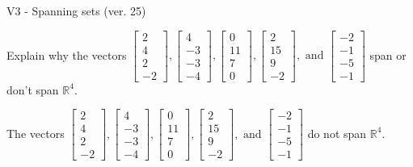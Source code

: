 \begin{exercise}
  \begin{exerciseTitle}V3 - Spanning sets (ver. 25)\end{exerciseTitle}
  \begin{exerciseStatement}
    Explain why the vectors \(\left[\begin{array}{r}
2 \\
4 \\
2 \\
-2
\end{array}\right] , \left[\begin{array}{r}
4 \\
-3 \\
-3 \\
-4
\end{array}\right] , \left[\begin{array}{r}
0 \\
11 \\
7 \\
0
\end{array}\right] , \left[\begin{array}{r}
2 \\
15 \\
9 \\
-2
\end{array}\right] , \text{ and } \left[\begin{array}{r}
-2 \\
-1 \\
-5 \\
-1
\end{array}\right]\) span or don't span \(\mathbb{R}^4\). 
	


  \end{exerciseStatement}
  \begin{exerciseAnswer}
   The vectors \(\left[\begin{array}{r}
2 \\
4 \\
2 \\
-2
\end{array}\right] , \left[\begin{array}{r}
4 \\
-3 \\
-3 \\
-4
\end{array}\right] , \left[\begin{array}{r}
0 \\
11 \\
7 \\
0
\end{array}\right] , \left[\begin{array}{r}
2 \\
15 \\
9 \\
-2
\end{array}\right] , \text{ and } \left[\begin{array}{r}
-2 \\
-1 \\
-5 \\
-1
\end{array}\right]\) 
  	 do not  
	span \(\mathbb{R}^4\).
  



\end{exerciseAnswer}
\end{exercise}
